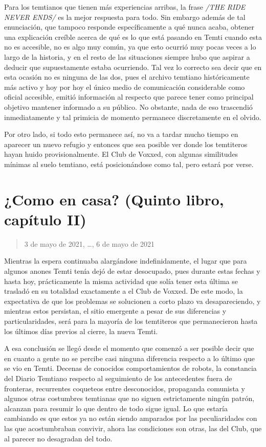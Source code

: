\documentclass[
  spanish,
]{book}
\begin{document}
Para los temtianos que tienen más experiencias arribas, la frase \emph{/THE RIDE NEVER ENDS/} es la mejor respuesta para todo. Sin embargo además de tal enunciación, que tampoco responde específicamente a qué nunca acaba, obtener una explicación creíble acerca de qué es lo que está pasando en Temti cuando esta no es accesible, no es algo muy común, ya que esto ocurrió muy pocas veces a lo largo de la historia, y en el resto de las situaciones siempre hubo que aspirar a deducir que supuestamente estaba ocurriendo. Tal vez lo correcto sea decir que en esta ocasión no es ninguna de las dos, pues el archivo temtiano históricamente más activo y hoy por hoy el único medio de comunicación considerable como oficial accesible, emitió información al respecto que parece tener como principal objetivo mantener informado a su público. No obstante, nada de eso trascendió inmediatamente y tal primicia de momento permanece discretamente en el olvido.

Por otro lado, si todo esto permanece así, no va a tardar mucho tiempo en aparecer un nuevo refugio y entonces que sea posible ver donde los temtiteros hayan huido provisionalmente. El Club de Voxxed, con algunas similitudes mínimas al suelo temtiano, está posicionándose como tal, pero estará por verse.

\hypertarget{como-en-casa-quinto-libro-capuxedtulo-ii}{%
\section{¿Como en casa? (Quinto libro, capítulo II)}\label{como-en-casa-quinto-libro-capuxedtulo-ii}}

\begin{quote}
3 de mayo de 2021, \ldots, 6 de mayo de 2021
\end{quote}

Mientras la espera continuaba alargándose indefinidamente, el lugar que para algunos anones Temti tenía dejó de estar desocupado, pues durante estas fechas y hasta hoy, prácticamente la misma actividad que solía tener esta última se trasladó en su totalidad exactamente a el Club de Voxxed. De este modo, la expectativa de que los problemas se solucionen a corto plazo va desapareciendo, y mientras estos persistan, el sitio emergente a pesar de sus diferencias y particularidades, será para la mayoría de los temtiteros que permanecieron hasta los últimos días previos al cierre, la nueva Temti.

A esa conclusión se llegó desde el momento que comenzó a ser posible decir que en cuanto a gente no se percibe casi ninguna diferencia respecto a lo último que se vio en Temti. Decenas de conocidos comportamientos de robots, la constancia del Diario Temtiano respecto al seguimiento de los antecedentes fuera de fronteras, recurrentes coqueteos entre desconocidos, propaganda comunista y algunos otras costumbres temtianas que no siguen estrictamente ningún patrón, alcanzan para resumir lo que dentro de todo sigue igual. Lo que estaría cambiando es que estos ya no están siendo amparados por las peculiaridades con las que acostumbraban convivir, ahora las condiciones son otras, las del Club, que al parecer no desagradan del todo.
\end{document}
